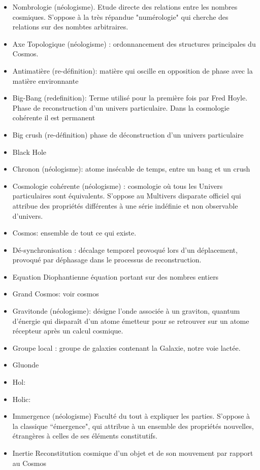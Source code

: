 \documentclass[a4paper,12pt]{article}
\begin{document}
\begin{appendix}
\begin{itemize}
\item Nombrologie (néologisme). Etude directe des relations entre les nombres cosmiques. S'oppose à la très répandue "numérologie" qui cherche des relations sur des nombtes arbitraires.
\item Axe Topologique (néologisme) : ordonnancement des structures principales du Cosmos.
\item Antimatière (re-définition): matière qui oscille en opposition de phase avec la matière environnante
\item Big-Bang (redefinition): Terme utilisé pour la première fois par Fred Hoyle. Phase de reconstruction d’un univers particulaire. Dans la cosmologie cohérente il est permanent
\item Big crush (re-définition) phase de déconstruction d’un univers particulaire
\item Black Hole
\item Chronon (néologisme): atome insécable de temps, entre un bang et un crush
\item Cosmologie cohérente (néologisme) : cosmologie où tous les Univers particulaires sont équivalents. S’oppose au Multivers disparate officiel qui attribue des propriétés différentes à une série indéfinie et non observable d’univers.
\item Cosmos: ensemble de tout ce qui existe.
\item Dé-synchronisation : décalage temporel provoqué lors d’un déplacement, provoqué par déphasage dans le processus de reconstruction.
\item Equation Diophantienne équation portant sur des nombres entiers
\item Grand Cosmos: voir cosmos
\item Gravitonde (néologisme): désigne l’onde associée à un graviton, quantum d’énergie qui disparaît d’un atome émetteur pour se retrouver sur un atome récepteur après un calcul cosmique.
\item Groupe local : groupe de galaxies contenant la Galaxie, notre voie lactée.
\item Gluonde
\item Hol: 
\item Holic:
\item Immergence (néologisme) Faculté du tout à expliquer les parties. S’oppose à la classique ``émergence", qui attribue à un ensemble des propriétés nouvelles, étrangères à celles de ses éléments constitutifs.
\item Inertie Reconstitution cosmique d’un objet et de son mouvement par rapport au Cosmos

\end{itemize}
\end{appendix}
\end{document}
